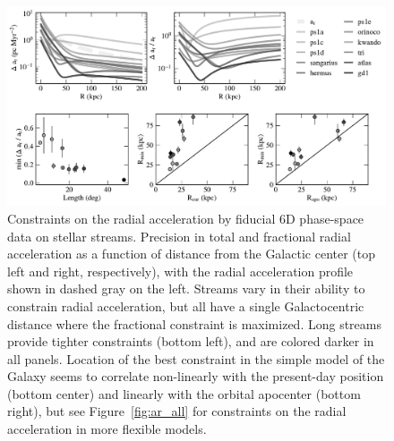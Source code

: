 \documentclass[modern]{aastex61}
\begin{document}
\begin{figure}
\begin{center}
\includegraphics[width=\textwidth]{ar_crb.pdf}
\caption{Constraints on the radial acceleration by fiducial 6D phase-space data on stellar streams.
Precision in total and fractional radial acceleration as a function of distance from the Galactic center (top left and right, respectively), with the radial acceleration profile shown in dashed gray on the left.
Streams vary in their ability to constrain radial acceleration, but all have a single Galactocentric distance where the fractional constraint is maximized.
Long streams provide tighter constraints (bottom left), and are colored darker in all panels.
Location of the best constraint in the simple model of the Galaxy seems to correlate non-linearly with the present-day position (bottom center) and linearly with the orbital apocenter (bottom right), but see Figure~\ref{fig:ar_all} for constraints on the radial acceleration in more flexible models.
}
\label{fig:ar}
\end{center}
\end{figure}
\end{document}
